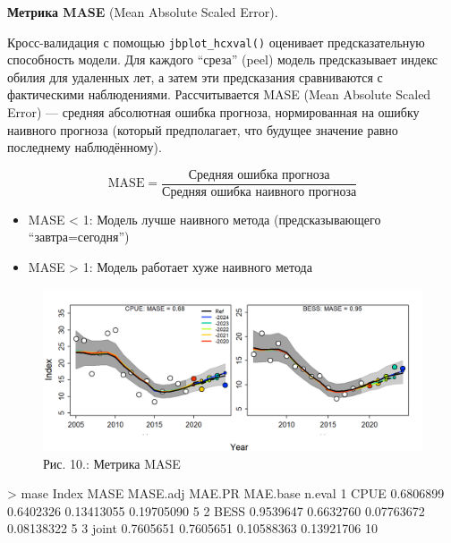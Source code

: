 \documentclass[
  letterpaper,
  DIV=11,
  numbers=noendperiod]{scrreprt}
\newenvironment{Shaded}{\begin{snugshade}}{\end{snugshade}}
\newcommand{\DecValTok}[1]{\textcolor[rgb]{0.68,0.00,0.00}{#1}}
\newcommand{\FloatTok}[1]{\textcolor[rgb]{0.68,0.00,0.00}{#1}}
\newcommand{\NormalTok}[1]{\textcolor[rgb]{0.00,0.23,0.31}{#1}}
\newcommand{\SpecialCharTok}[1]{\textcolor[rgb]{0.37,0.37,0.37}{#1}}
\begin{document}
\textbf{Метрика MASE} (Mean Absolute Scaled Error).

Кросс-валидация с помощью \texttt{jbplot\_hcxval()} оценивает
предсказательную способность модели. Для каждого ``среза'' (peel) модель
предсказывает индекс обилия для удаленных лет, а затем эти предсказания
сравниваются с фактическими наблюдениями. Рассчитывается MASE (Mean
Absolute Scaled Error) --- средняя абсолютная ошибка прогноза,
нормированная на ошибку наивного прогноза (который предполагает, что
будущее значение равно последнему наблюдённому).

\[
\mathrm{MASE} = \frac{\text{Средняя ошибка прогноза}}{\text{Средняя ошибка наивного прогноза}}
\]

\begin{itemize}
\item
  MASE \textless{} 1: Модель лучше наивного метода (предсказывающего
  ``завтра=сегодня'')
\item
  MASE \textgreater{} 1: Модель работает хуже наивного метода
\end{itemize}

\begin{figure}[H]

{\centering \includegraphics[width=0.8\linewidth,height=\textheight,keepaspectratio]{images/JABBA10.PNG}

}

\caption{Рис. 10.: Метрика MASE}

\end{figure}%

\begin{Shaded}
\begin{Highlighting}[]
\SpecialCharTok{\textgreater{}}\NormalTok{ mase}
\NormalTok{  Index      MASE  MASE.adj     MAE.PR   MAE.base n.eval}
\DecValTok{1}\NormalTok{  CPUE }\FloatTok{0.6806899} \FloatTok{0.6402326} \FloatTok{0.13413055} \FloatTok{0.19705090}      \DecValTok{5}
\DecValTok{2}\NormalTok{  BESS }\FloatTok{0.9539647} \FloatTok{0.6632760} \FloatTok{0.07763672} \FloatTok{0.08138322}      \DecValTok{5}
\DecValTok{3}\NormalTok{ joint }\FloatTok{0.7605651} \FloatTok{0.7605651} \FloatTok{0.10588363} \FloatTok{0.13921706}     \DecValTok{10}
\end{Highlighting}
\end{Shaded}
\end{document}
